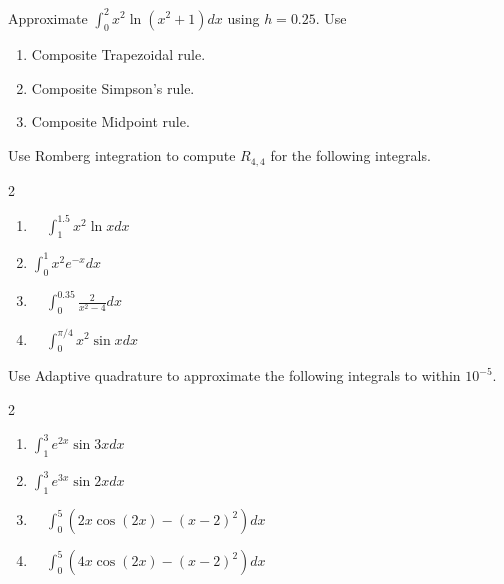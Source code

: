 

\begin{posttest}[\textcolor{red}{End of Module 5 Quiz}]
\item Approximate $\int_{0}^{2} x^{2} \ln \left(x^{2}+1\right) d x$ using $h=0.25$. Use
\begin{enumerate}[label=(\alph*)]
\item Composite Trapezoidal rule.
\item Composite Simpson's rule.
\item Composite Midpoint rule.
\end{enumerate}

\item Use Romberg integration to compute $R_{4,4}$ for the following integrals.
\begin{multicols}{2}
\begin{enumerate}[label=(\alph*)]
\item  $\quad \int_{1}^{1.5} x^{2} \ln x d x$\\
\item $\int_{0}^{1} x^{2} e^{-x} d x$\\
\item $\quad \int_{0}^{0.35} \frac{2}{x^{2}-4} d x$\\
\item $\quad \int_{0}^{\pi / 4} x^{2} \sin x d x$\\
\end{enumerate}
\end{multicols}

\item Use Adaptive quadrature to approximate the following integrals to within $10^{-5}$.
\begin{multicols}{2}
\begin{enumerate}[label=(\alph*)]
\item $\int_{1}^{3} e^{2 x} \sin 3 x d x$\\
\item $\int_{1}^{3} e^{3 x} \sin 2 x d x$\\
\item $\quad \int_{0}^{5}\left(2 x \cos (2 x)-(x-2)^{2}\right) d x$\\
\item $\quad \int_{0}^{5}\left(4 x \cos (2 x)-(x-2)^{2}\right) d x$
\end{enumerate}
\end{multicols}


\end{posttest}
